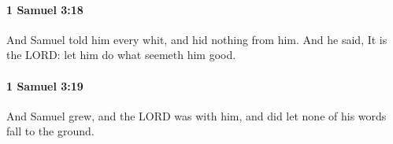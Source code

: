 		\paragraph{1 Samuel 3:18} %
			\label{1SAMUEL-3-18}

			And Samuel told him every whit, and hid nothing from him. And he said, It is the LORD: let him do what seemeth him good.


		\paragraph{1 Samuel 3:19} %
			\label{1SAMUEL-3-19}

			And Samuel grew, and the LORD was with him, and did let none of his words fall to the ground.


